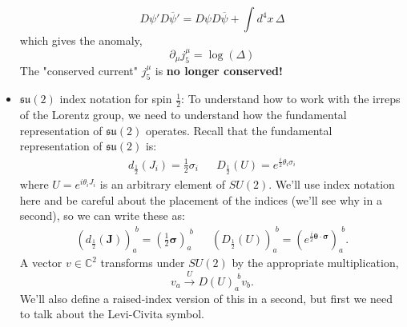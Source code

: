 \documentclass[12pt, oneside]{article}   	%
\theoremstyle{definition}
\begin{document}
\begin{itemize}
\begin{answerbox}
	\begin{equation}
		D\psi' D\overline\psi' = D\psi D\overline\psi + \int d^4 x\,\Delta
	\end{equation}
	which gives the anomaly,
	\begin{equation}
		\partial_\mu j_5^\mu = \log(\Delta)
	\end{equation}
	The "conserved current" $j_5^\mu$ is \textbf{no longer conserved!}
	\end{answerbox}
	
	\item $\mathfrak{su}(2)$ index notation for spin $\frac{1}{2}$:  To understand how to work with the irreps of the Lorentz group, we need to understand how the fundamental representation of $\mathfrak{su}(2)$ operates. Recall that the fundamental representation of $\mathfrak{su}(2)$ is:
	\begin{align}
		d_\frac{1}{2}(J_i) = \frac{1}{2} \sigma_i && D_{\frac{1}{2}}(U) = e^{\frac{i}{2} \theta_i \sigma_i}
	\end{align}
	where $U = e^{i\theta_i J_i}$ is an arbitrary element of $SU(2)$. We'll use index notation here and be careful about the placement of the indices (we'll see why in a second), so we can write these as:
	\begin{align}
		\left(d_\frac{1}{2}(\bm J)\right)_a^{\,\,b} = \left(\frac{1}{2} \bm\sigma\right)_a^{\,\, b} && \left(D_{\frac{1}{2}}(U)\right)_a^{\,\, b} = \left(e^{\frac{i}{2}\bm \theta\cdot \bm \sigma}\right)_a^{\,\, b}.
	\end{align}
	A vector $v\in \mathbb C^2$ transforms under $SU(2)$ by the appropriate multiplication,
	\begin{equation}
		v_a\xrightarrow{U} D(U)_a^{\,\, b} v_b.
	\end{equation}
	We'll also define a raised-index version of this in a second, but first we need to talk about the Levi-Civita symbol.
	

\end{itemize}
\end{document}
